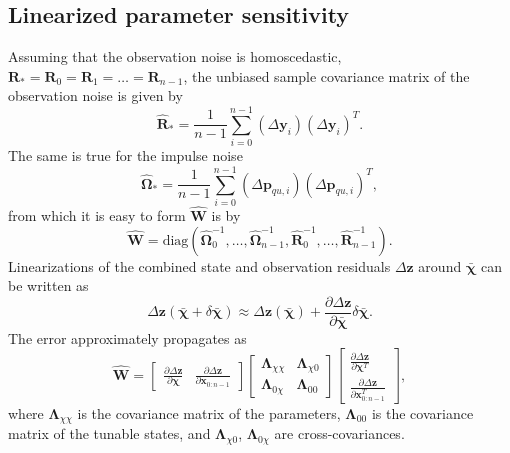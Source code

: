\documentclass[preprint,12pt]{elsarticle}
\let\vec\bm
\let\mat\mathbf
\def\param{\vec{\chi}}
\numberwithin{equation}{section}
\def\combresiduals{ \Delta \vec{z}}
\begin{document}
\subsection{Linearized parameter sensitivity}
Assuming that the observation noise is homoscedastic, $\mat{R}_* = \mat{R}_0 = \mat{R}_1 = \hdots = \mat{R}_{n-1}$, the unbiased sample covariance matrix of the observation noise is given by
\begin{equation}
    \hat{\mat{R}}_* = \frac{1}{n-1} \sum_{i=0}^{n-1} (\Delta \vec{y}_i) (\Delta \vec{y}_i)^T.
\end{equation}
The same is true for the impulse noise
\begin{equation}
    \hat{\mat{\Omega}}_* = \frac{1}{n-1} \sum_{i=0}^{n-1} (\Delta \vec{p}_{qu,i}) (\Delta \vec{p}_{qu,i})^T,
\end{equation}
from which it is easy to form $\hat{\mat{W}}$ is by
\begin{equation}
    \hat{\mat{W}} = \text{diag}(\hat{\mat{\Omega}}_0^{-1}, \hdots, \hat{\mat{\Omega}}_{n-1}^{-1}, \hat{\mat{R}}_0^{-1}, \hdots, \hat{\mat{R}}_{n-1}^{-1}).
\end{equation}
Linearizations of the combined state and observation residuals $\combresiduals$ around $\bar{\param}$ can be written as
\begin{equation}
    \combresiduals(\bar{\param} + \delta \bar{\param}) \approx 
    \combresiduals(\bar{\param}) +
    \frac{\partial \combresiduals}{\partial \bar{\param}} \delta \bar{\param}.
\end{equation}
The error approximately propagates as
\begin{equation}
    \hat{\mat{W}} = 
    \begin{bmatrix}
        \frac{\partial \combresiduals}{\partial \param} &
        \frac{\partial \combresiduals}{\partial \vec{x}_{0:n-1}}
    \end{bmatrix}
    \begin{bmatrix}
        \mat{\Lambda}_{\chi \chi} & \mat{\Lambda}_{\chi 0} \\
        \mat{\Lambda}_{0 \chi} & \mat{\Lambda}_{0 0}
    \end{bmatrix}
    \begin{bmatrix}
        \frac{\partial \Delta  \vec{z}}{\partial \param^T} \\
        \frac{\partial \Delta  \vec{z}}{\partial \vec{x}_{0:n-1}^T}
    \end{bmatrix},
\end{equation}
where $\vec{\Lambda}_{\chi \chi}$ is the covariance matrix of the parameters, $\vec{\Lambda}_{0 0}$ is the covariance matrix of the tunable states, and $\vec{\Lambda}_{\chi 0}$, $\vec{\Lambda}_{0 \chi}$ are cross-covariances.
\end{document}
